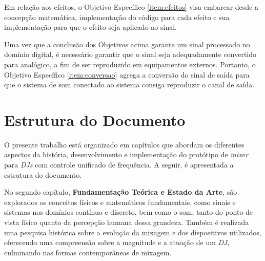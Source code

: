 Em relação aos efeitos, o Objetivo Específico \ref{item:efeitos} visa embarcar desde a concepção matemática, implementação do código para cada efeito e sua implementação para que o efeito seja aplicado ao sinal.

Uma vez que a conclusão dos Objetivos acima garante um sinal processado no domínio digital, é necessário garantir que o sinal seja adequadamente convertido para analógico, a fim de ser reproduzido em equipamentos externos. Portanto, o Objetivo Específico \ref{item:conversao} agrega a conversão do sinal de saída para que o sistema de som conectado ao sistema consiga reproduzir o canal de saída.

\section{Estrutura do Documento}

O presente trabalho está organizado em capítulos que abordam os diferentes aspectos da história, desenvolvimento e implementação do protótipo de \textit{mixer} para \textit{DJs} com controle unificado de frequência. A seguir, é apresentada a estrutura do documento.

No segundo capítulo, \textbf{Fundamentação Teórica e Estado da Arte}, são explorados os conceitos físicos e matemáticos fundamentais, como sinais e sistemas nos domínios contínuo e discreto, %
bem como o som, tanto do ponto de vista físico quanto da percepção humana dessa grandeza. Também é realizada uma pesquisa histórica sobre a evolução da mixagem e dos dispositivos utilizados, oferecendo uma compreensão sobre a magnitude e a atuação de um \textit{DJ}, culminando nas formas contemporâneas de mixagem.

